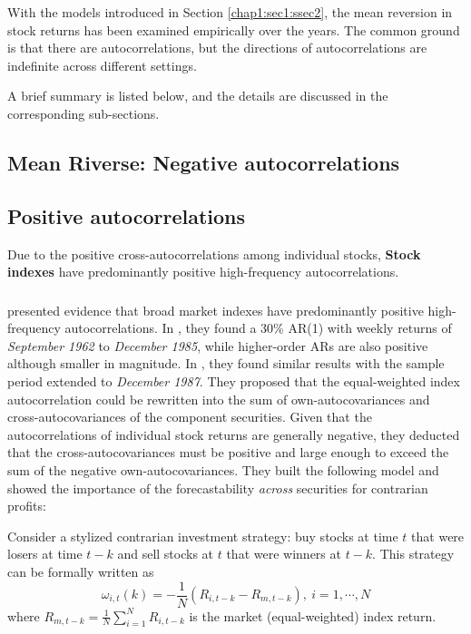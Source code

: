 With the models introduced in Section \ref{chap1:sec1:ssec2}, the mean reversion in stock returns
has been examined empirically over the years. The common ground is that there are autocorrelations,
but the directions of autocorrelations are indefinite across different settings.

A brief summary is listed below, and the details are discussed in the corresponding sub-sections.

\subsection{Mean Riverse: Negative autocorrelations}\label{chap1:sec2:ssec1}

\subsection{Positive autocorrelations}\label{chap1:sec2:ssec2}
Due to the positive cross-autocorrelations among individual stocks, \textbf{Stock indexes} have predominantly
positive high-frequency autocorrelations.

\subsubsection{\citet{lo1988stock,lo1990contrarian}}\label{chap1:sec2:ssec2:paper1}
\citet{lo1988stock,lo1990contrarian} presented evidence that broad market indexes have predominantly positive
high-frequency autocorrelations. In \citeyear{lo1988stock}, they found a 30\% AR(1) with weekly returns
of \textit{September 1962} to \textit{December 1985}, while higher-order ARs are also positive although smaller in magnitude.
In \citeyear{lo1990contrarian}, they found similar results with the sample period extended to \textit{December 1987}.
They proposed that the equal-weighted index autocorrelation could be rewritten into the sum of own-autocovariances
and cross-autocovariances of the component securities. Given that the autocorrelations of individual stock returns
are generally negative, they deducted that the cross-autocovariances must be positive and large enough to exceed the sum
of the negative own-autocovariances. They built the following model and showed the importance of the forecastability 
\textit{across} securities for contrarian profits:

Consider a stylized contrarian investment strategy: buy stocks at time $t$ that were losers at time $t-k$ and sell 
stocks at $t$ that were winners at $t-k$. This strategy can be formally written as 
$$
\omega_{i,t}(k)=-\frac{1}{N}(R_{i,t-k}-R_{m,t-k}),\ i=1,\cdots,N
$$
where $R_{m,t-k}=\frac{1}{N}\sum^N_{i=1}R_{i,t-k}$ is the market (equal-weighted) index return.

